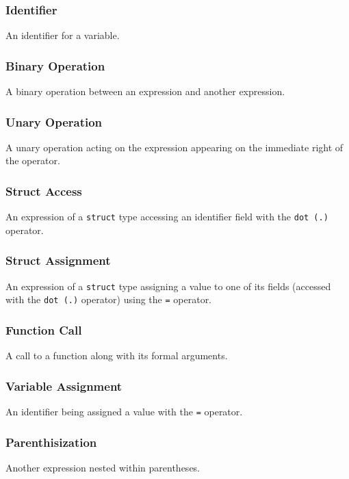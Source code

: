     \subsubsection{Identifier}
      An identifier for a variable.
    \subsubsection{Binary Operation}
      A binary operation between an expression and another expression.
    \subsubsection{Unary Operation}
      A unary operation acting on the expression appearing on the immediate right of the operator.
    \subsubsection{Struct Access}
      An expression of a \texttt{struct} type accessing an identifier field with the \texttt{dot (.)} operator.
    \subsubsection{Struct Assignment}
      An expression of a \texttt{struct} type assigning a value to one of its fields (accessed with the \texttt{dot (.)} operator) using the \texttt{=} operator.
    \subsubsection{Function Call}
      A call to a function along with its formal arguments.
    \subsubsection{Variable Assignment}
      An identifier being assigned a value with the \texttt{=} operator.
    \subsubsection{Parenthisization}
      Another expression nested within parentheses.


